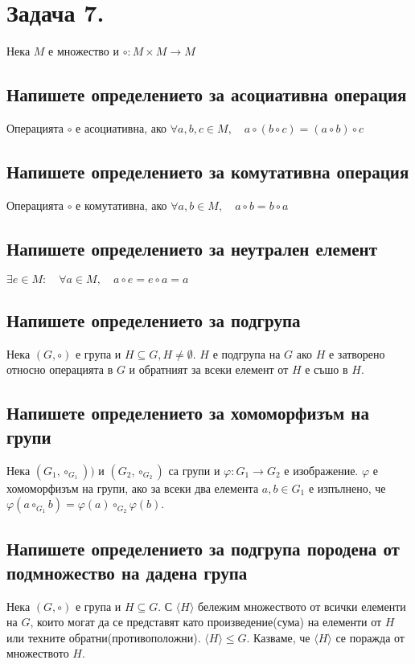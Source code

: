 \documentclass[12pt]{article}
\begin{document}
\section*{Задача 7.}
Нека $M$ е множество и $\circ: M \times M \to M$

\subsection*{Напишете определението за асоциативна операция}
Операцията $\circ$ е асоциативна, ако $\forall a, b, c \in M, \quad a \circ (b \circ c) = (a \circ b) \circ c$

\subsection*{Напишете определението за комутативна операция}
Операцията $\circ$ е комутативна, ако $\forall a, b \in M, \quad a \circ b = b \circ a$

\subsection*{Напишете определението за неутрален елемент}
$\exists e \in M: \quad \forall a \in M, \quad a \circ e = e \circ a = a$

\subsection*{Напишете определението за подгрупа}
Нека $(G, \circ)$ е група и $H \subseteq G, H \neq \emptyset$. $H$ е подгрупа на $G$ ако $H$ е затворено относно операцията в $G$ и обратният за всеки елемент от $H$ е съшо в $H$.

\subsection*{Напишете определението за хомоморфизъм на групи}
Нека $(G_1, \circ_{G_1}))$ и $(G_2, \circ_{G_2})$ са групи и $\varphi: G_1 \to G_2$ е изображение. $\varphi$ е хомоморфизъм на групи, ако за всеки два елемента $a, b \in G_1$ е изпълнено, че $\varphi(a \circ_{G_1} b) = \varphi(a) \circ_{G_2} \varphi(b)$.

\subsection*{Напишете определението за подгрупа породена от подмножество на дадена група}
Нека $(G, \circ)$ е група и $H \subseteq G$. С $\langle H \rangle$ бележим множеството от всички елементи на $G$, които могат да се представят като произведение(сума) на елементи от $H$ или техните обратни(противоположни). $\langle H \rangle \leq G$. Казваме, че $\langle H \rangle$ се поражда от множеството $H$.
\end{document}
